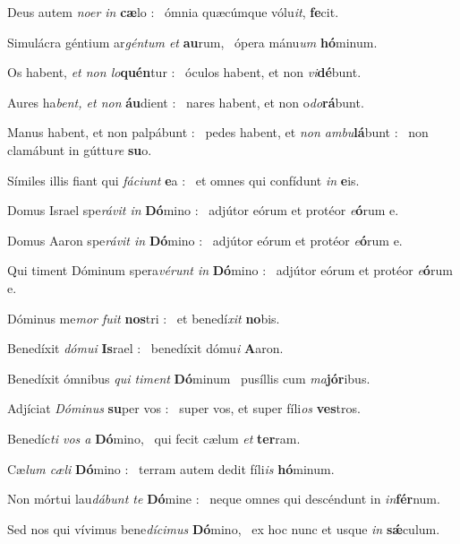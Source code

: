 \documentclass[12pt]{article} %
\newenvironment{psalmtext}{\leftskip 0.25in}{\vspace{1 mm}}
\let\oldgresixstar\gresixstar
\renewcommand{\gresixstar}{\textcolor{benred8}{\oldgresixstar}}
\let\oldgredagger\gredagger
\renewcommand{\gredagger}{\textcolor{benred8}{\oldgredagger}}
\begin{document}
\begin{pages}
\begin{Leftside}
\begin{psalmtext}
Deus autem \emph{noer in} \textbf{cæ}lo : \gresixstar\ ómnia quæcúmque vólu\emph{it}, \textbf{fe}cit.

Simulácra géntium ar\emph{géntum et} \textbf{au}rum, \gresixstar\ ópera mánu\emph{um} \textbf{hó}minum.

Os habent, \emph{et non lo}\textbf{quén}tur : \gresixstar\ óculos habent, et non \emph{vi}\textbf{dé}bunt.

Aures ha\emph{bent, et non} \textbf{áu}dient : \gresixstar\ nares habent, et non o\emph{do}\textbf{rá}bunt.

Manus habent, et non palpábunt : \gredagger\ pedes habent, et \emph{non ambu}\textbf{lá}bunt : \gresixstar\ non clamábunt in gúttu\emph{re} \textbf{su}o.

Símiles illis fiant qui \emph{fáciunt} \textbf{e}a : \gresixstar\ et omnes qui confídunt \emph{in} \textbf{e}is.

Domus Israel spe\emph{rávit in} \textbf{Dó}mino : \gresixstar\ adjútor eórum et protéor \emph{e}\textbf{ó}rum e.

Domus Aaron spe\emph{rávit in} \textbf{Dó}mino : \gresixstar\ adjútor eórum et protéor \emph{e}\textbf{ó}rum e.

Qui timent Dóminum spera\emph{vérunt in} \textbf{Dó}mino : \gresixstar\ adjútor eórum et protéor \emph{e}\textbf{ó}rum e.

Dóminus me\emph{mor fuit} \textbf{nos}tri : \gresixstar\ et benedí\emph{xit} \textbf{no}bis.

Benedíxit \emph{dómui} \textbf{Is}rael : \gresixstar\ benedíxit dómu\emph{i} \textbf{A}aron.

Benedíxit ómnibus \emph{qui timent} \textbf{Dó}minum \gresixstar\ pusíllis cum \emph{ma}\textbf{jór}ibus.

Adjíciat \emph{Dóminus} \textbf{su}per vos : \gresixstar\ super vos, et super fíli\emph{os} \textbf{ves}tros.

Benedíc\emph{ti vos a} \textbf{Dó}mino, \gresixstar\ qui fecit cælum \emph{et} \textbf{ter}ram.

Cæ\emph{lum cæli} \textbf{Dó}mino : \gresixstar\ terram autem dedit fíli\emph{is} \textbf{hó}minum.

Non mórtui lau\emph{dábunt te} \textbf{Dó}mine : \gresixstar\ neque omnes qui descéndunt in \emph{in}\textbf{fér}num.

Sed nos qui vívimus bene\emph{dícimus} \textbf{Dó}mino, \gresixstar\ ex hoc nunc et usque \emph{in} \textbf{sǽ}culum.


\end{psalmtext}
\end{Leftside}
\end{pages}
\end{document}
